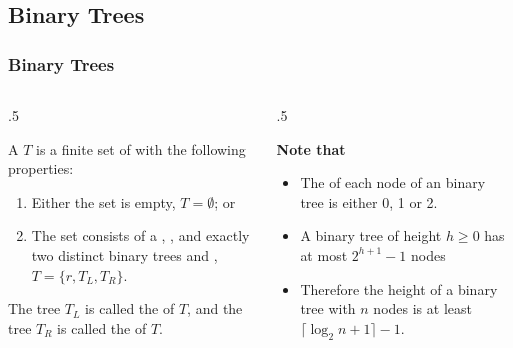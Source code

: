 \documentclass[10pt]{beamer}
\begin{document}
\subsection{Binary Trees}
\begin{frame}[t]\frametitle{Binary Trees}
	\begin{columns}[T] %
	\begin{column}{.5\linewidth} %
		{\small
		\begin{definition}
		A  $T$
		is a finite set of 
		with the following properties:
		\begin{enumerate}
		
			\item 
			Either the set is empty, $T=\emptyset$; or
			
			\item 
			The set consists of a , ,
			and exactly two distinct binary trees  and ,
			$T = \{ r, T_{L}, T_{R} \}$.
		\end{enumerate}
		The tree $T_{L}$ is called the  of $T$,
		and the tree $T_{R}$ is called the  of $T$.
		\end{definition}
		} %
	\end{column} %
	\begin{column}{.5\linewidth} %
		{\small 
		\textbf{Note that}
		\begin{itemize}
	
			\item
			The  of each node of an binary tree is either 0, 1  or 2.

			\item
			A binary tree of height $h \ge 0$ has at most $2^{h+1}-1$ nodes
			
			\item
			Therefore the height of a binary tree with $n$  nodes is at least 
			$\lceil \log_{2} n+1 \rceil - 1$.

		\end{itemize}
		} %
	\end{column} %
	\end{columns} %
\end{frame}
\end{document}
